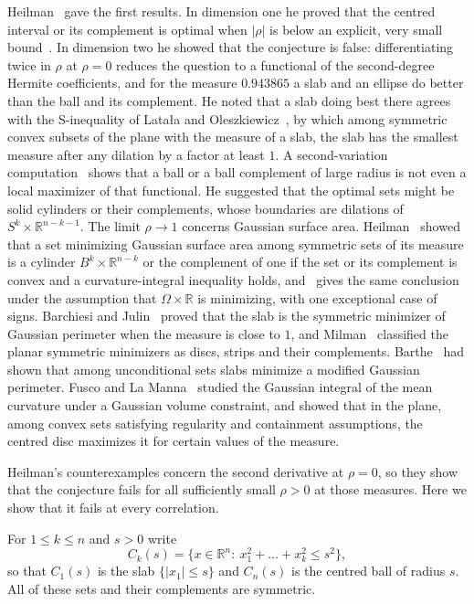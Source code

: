 \documentclass[11pt]{amsart}
\theoremstyle{remark}
\newcommand{\R}{\mathbb{R}}
\begin{document}
Heilman~\cite{H1} gave the first results. In dimension one he proved that the centred interval or its complement is
optimal when $|\rho|$ is below an explicit, very small bound~\cite[Theorem~1.5]{H1}. In dimension two he showed that
the conjecture is false: differentiating twice in $\rho$ at $\rho=0$ reduces the question to a functional of the
second-degree Hermite coefficients, and for the measure $0.943865$ a slab and an ellipse do better than the ball and
its complement. He noted that a slab doing best there agrees with the S-inequality of Latała and
Oleszkiewicz~\cite{LO}, by which among symmetric convex subsets of the plane with the measure of a slab, the slab has
the smallest measure after any dilation by a factor at least $1$. A second-variation computation~\cite[Theorem~1.7]{H1} shows that a ball or a ball complement of large
radius is not even a local maximizer of that functional. He suggested that the optimal sets might be solid cylinders or their
complements, whose boundaries are dilations of $S^k\times\R^{n-k-1}$. The limit $\rho\to1$ concerns Gaussian surface
area. Heilman~\cite[Theorem~1.11]{H2} showed that a set minimizing Gaussian surface area among symmetric sets of its
measure is a cylinder $B^k\times\R^{n-k}$ or the complement of one if the set or its complement is convex and a
curvature-integral inequality holds, and~\cite[Theorem~2.4]{H3} gives the same conclusion under the assumption that
$\Omega\times\R$ is minimizing, with one exceptional case of signs. Barchiesi and Julin~\cite{BJ} proved that the
slab is the symmetric minimizer of Gaussian perimeter when the measure is close to $1$, and Milman~\cite{Milman}
classified the planar symmetric minimizers as discs, strips and their complements. Barthe~\cite{Barthe} had shown
that among unconditional sets slabs minimize a modified Gaussian perimeter. Fusco and La Manna~\cite{FLM} studied the
Gaussian integral of the mean curvature under a Gaussian volume constraint, and showed that in the plane, among convex
sets satisfying regularity and containment assumptions, the centred disc maximizes it for certain values of the
measure.

Heilman's counterexamples concern the second derivative at $\rho=0$, so they show that the conjecture fails for all
sufficiently small $\rho>0$ at those measures. Here we show that it fails at every correlation.

For $1\le k\le n$ and $s>0$ write
\[
C_k(s)=\{x\in\R^n:\ x_1^2+\dots+x_k^2\le s^2\},
\]
so that $C_1(s)$ is the slab $\{|x_1|\le s\}$ and $C_n(s)$ is the centred ball of radius $s$. All of these sets and
their complements are symmetric.
\end{document}
